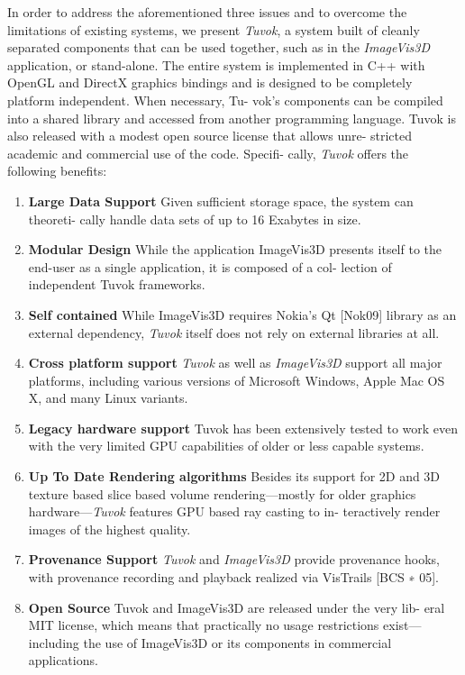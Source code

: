 In order to address the aforementioned three issues and to overcome the
limitations of existing systems, we present \textit{Tuvok}, a system
built of cleanly separated components that can
be used together, such as in the \textit{ImageVis3D} application,
or stand-alone. The entire system is implemented in C++ with OpenGL
and DirectX graphics bindings and is designed to be completely
platform independent. When necessary, Tu- vok’s components can be
compiled into a shared library and accessed from another programming
language. Tuvok is also released with a modest open source license that
allows unre- stricted academic and commercial use of the code. Specifi-
cally, \textit{Tuvok} offers the following benefits:

\begin{enumerate}

\item \textbf{Large Data Support}
Given sufficient storage space, the system can theoreti-
cally handle data sets of up to 16 Exabytes in size.
\item \textbf{Modular Design}
While the application ImageVis3D presents itself to the
end-user as a single application, it is composed of a col-
lection of independent Tuvok frameworks.
\item \textbf{Self contained}
While ImageVis3D requires Nokia's Qt [Nok09] library
as an external dependency, \textit{Tuvok} itself does not rely on
external libraries at all.
\item \textbf{Cross platform support}
\textit{Tuvok} as well as \textit{ImageVis3D} support all major platforms,
including various versions of Microsoft Windows, Apple
Mac OS X, and many Linux variants.
\item \textbf{Legacy hardware support}
Tuvok has been extensively tested to work even with the
very limited GPU capabilities of older or less capable
systems.
\item \textbf{Up To Date Rendering algorithms}
Besides its support for 2D and 3D texture based slice
based volume rendering—mostly for older graphics
hardware—\textit{Tuvok} features GPU based ray casting to in-
teractively render images of the highest quality.
\item \textbf{Provenance Support}
\textit{Tuvok} and \textit{ImageVis3D} provide provenance hooks, with
provenance recording and playback realized via VisTrails
[BCS ∗ 05].
\item \textbf{Open Source}
Tuvok and ImageVis3D are released under the very lib-
eral MIT license, which means that practically no usage
restrictions exist—including the use of ImageVis3D or its
components in commercial applications.

\end{enumerate}

